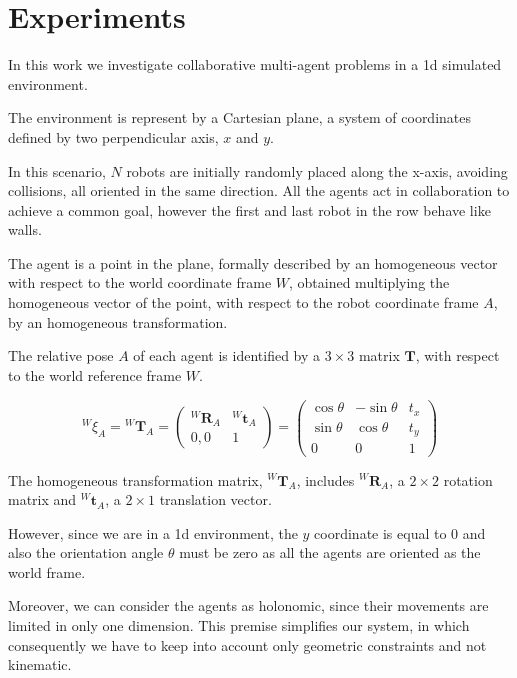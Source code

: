 \chapter{Experiments}
\label{chap:experiments}


In this work we investigate collaborative multi-agent problems in a \gls{1d} 
simulated environment.

The environment is represent by a Cartesian plane, a system of coordinates
defined by two perpendicular axis, $x$ and $y$. 

In this scenario, $N$ robots are initially randomly placed along the x-axis, 
avoiding collisions, all oriented in the same direction. All the agents act in 
collaboration to achieve a common goal, however the first and last robot in the 
row behave like walls. %

The agent is a point in the plane, formally described by an homogeneous vector 
with respect to the world coordinate frame $W$, obtained multiplying the 
homogeneous vector of the point, with respect to the robot coordinate frame 
$A$, by an homogeneous transformation. 

The relative pose $A$ of each agent is identified by a $3 \times 3$ matrix 
$\mathbf{T}$, with respect to the world reference frame $W$. 

\begin{Equation}[!htb]
	\centering
	\begin{equation}
	\label{eq:homogeneous transformation matrix}
	{^W\!\xi_A} = {^W\!\mathbf{T}_A} 
	=
	\begin{pmatrix}
	^W\!\mathbf{R}_A & ^W\!\mathbf{t}_A\\
	0, 0 & 1
	\end{pmatrix}
	=
	\begin{pmatrix}
	\cos \theta & - \sin \theta & t_x\\
	\sin \theta & \cos \theta & t_y\\
	0 & 0 & 1
	\end{pmatrix}
	\end{equation}
	\caption[Homogeneous Transformation Matrix]{The homogeneous 
	transformation matrix, 	$^W\!\mathbf{T}_A$, includes $^W\!\mathbf{R}_A$, a 
	$2 \times 2$ rotation matrix and $^W\!\mathbf{t}_A$, a $2 \times 1$ 
	translation vector.}
	\label{eq:hommatrix}
\end{Equation}

However, since we are in a \gls{1d} environment, the $y$ coordinate is equal 
to $0$ and also the orientation angle $\theta$ must be zero as all the agents are 
oriented as the world frame. 

Moreover, we can consider the agents as holonomic, since their movements are 
limited in only one dimension. This premise simplifies our system, in which 
consequently we have to keep into account only geometric constraints and not
kinematic.



